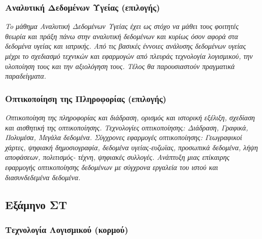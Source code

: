 \hypertarget{ux3b1ux3bdux3b1ux3bbux3c5ux3c4ux3b9ux3baux3ae-ux3b4ux3b5ux3b4ux3bfux3bcux3adux3bdux3c9ux3bd-ux3c5ux3b3ux3b5ux3afux3b1ux3c2-ux3b5ux3c0ux3b9ux3bbux3bfux3b3ux3aeux3c2}{%
\subsubsection{Αναλυτική Δεδομένων Υγείας
(επιλογής)}\label{ux3b1ux3bdux3b1ux3bbux3c5ux3c4ux3b9ux3baux3ae-ux3b4ux3b5ux3b4ux3bfux3bcux3adux3bdux3c9ux3bd-ux3c5ux3b3ux3b5ux3afux3b1ux3c2-ux3b5ux3c0ux3b9ux3bbux3bfux3b3ux3aeux3c2}}

\emph{To μάθημα Αναλυτική Δεδομένων Υγείας έχει ως στόχο να μάθει τους
φοιτητές θεωρία και πράξη πάνω στην αναλυτική δεδομένων και κυρίως όσον
αφορά στα δεδομένα υγείας και ιατρικής. Από τις βασικές έννοιες ανάλυσης
δεδομένων υγείας μέχρι το σχεδιασμό τεχνικών και εφαρμογών από πλευράς
τεχνολογία λογισμικού, την υλοποίηση τους και την αξιολόγηση τους. Τέλος
θα παρουσιαστούν πραγματικά παραδείγματα.}

\hypertarget{ux3bfux3c0ux3c4ux3b9ux3baux3bfux3c0ux3bfux3afux3b7ux3c3ux3b7-ux3c4ux3b7ux3c2-ux3c0ux3bbux3b7ux3c1ux3bfux3c6ux3bfux3c1ux3afux3b1ux3c2-ux3b5ux3c0ux3b9ux3bbux3bfux3b3ux3aeux3c2}{%
\subsubsection{Οπτικοποίηση της Πληροφορίας
(επιλογής)}\label{ux3bfux3c0ux3c4ux3b9ux3baux3bfux3c0ux3bfux3afux3b7ux3c3ux3b7-ux3c4ux3b7ux3c2-ux3c0ux3bbux3b7ux3c1ux3bfux3c6ux3bfux3c1ux3afux3b1ux3c2-ux3b5ux3c0ux3b9ux3bbux3bfux3b3ux3aeux3c2}}

\emph{Οπτικοποίηση της πληροφορίας και διάδραση, ορισμός και ιστορική
εξέλιξη, σχεδίαση και αισθητική της οπτικοποίησης. Τεχνολογίες
οπτικοποίησης: Διάδραση, Γραφικά, Πολυμέσα, Μεγάλα δεδομένα. Σύγχρονες
εφαρμογές οπτικοποίησης: Γεωγραφικοί χάρτες, ψηφιακή δημοσιογραφία,
δεδομένα υγείας-ευζωϊας, προσωπικά δεδομένα, λήψη αποφάσεων, πολιτισμός-
τέχνη, ψηφιακές συλλογές. Ανάπτυξη μιας επίκαιρης εφαρμογής
οπτικοποίησης δεδομένων με σύγχρονα εργαλεία του ιστού και
διασυνδεδεμένα δεδομένα.}

\hypertarget{ux3b5ux3beux3acux3bcux3b7ux3bdux3bf-ux3c3ux3c4}{%
\subsection{Εξάμηνο
ΣΤ}\label{ux3b5ux3beux3acux3bcux3b7ux3bdux3bf-ux3c3ux3c4}}

\hypertarget{ux3c4ux3b5ux3c7ux3bdux3bfux3bbux3bfux3b3ux3afux3b1-ux3bbux3bfux3b3ux3b9ux3c3ux3bcux3b9ux3baux3bfux3cd-ux3baux3bfux3c1ux3bcux3bfux3cd}{%
\subsubsection{Τεχνολογία Λογισμικού
(κορμού)}\label{ux3c4ux3b5ux3c7ux3bdux3bfux3bbux3bfux3b3ux3afux3b1-ux3bbux3bfux3b3ux3b9ux3c3ux3bcux3b9ux3baux3bfux3cd-ux3baux3bfux3c1ux3bcux3bfux3cd}}

